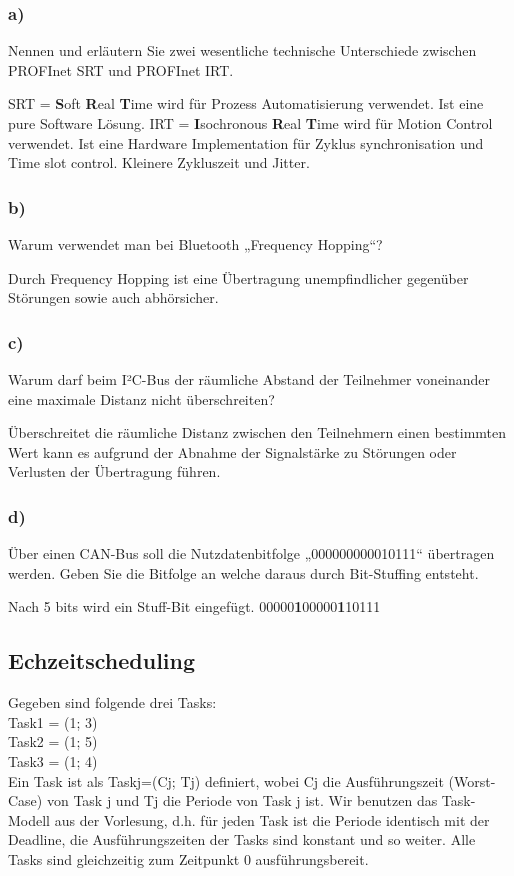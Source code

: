 \subsubsection{a)}
Nennen und erläutern Sie zwei wesentliche technische Unterschiede zwischen PROFInet SRT und
PROFInet IRT.

SRT = \textbf{S}oft \textbf{R}eal \textbf{T}ime wird für Prozess Automatisierung verwendet. Ist eine pure Software Lösung.
IRT = \textbf{I}sochronous \textbf{R}eal \textbf{T}ime wird für Motion Control verwendet. Ist eine Hardware Implementation  für Zyklus
synchronisation und Time slot control. Kleinere Zykluszeit und Jitter.

\subsubsection{b)}
Warum verwendet man bei Bluetooth „Frequency Hopping“?

Durch Frequency Hopping ist eine Übertragung unempfindlicher gegenüber Störungen sowie auch abhörsicher.

\subsubsection{c)}
Warum darf beim I²C-Bus der räumliche Abstand der Teilnehmer voneinander eine maximale
Distanz nicht überschreiten?

Überschreitet die räumliche Distanz zwischen den Teilnehmern einen bestimmten Wert kann es aufgrund der Abnahme
der Signalstärke zu Störungen oder Verlusten der Übertragung führen.

\subsubsection{d)}
Über einen CAN-Bus soll die Nutzdatenbitfolge „000000000010111“ übertragen werden. Geben Sie
die Bitfolge an welche daraus durch Bit-Stuffing entsteht.

Nach 5 bits wird ein Stuff-Bit eingefügt.
00000\textbf{1}00000\textbf{1}10111

\subsection{Echzeitscheduling}
Gegeben sind folgende drei Tasks:\\
Task1 = (1; 3)\\
Task2 = (1; 5)\\
Task3 = (1; 4)\\
Ein Task ist als Taskj=(Cj; Tj) definiert, wobei Cj die Ausführungszeit (Worst-Case) von Task j und Tj die
Periode von Task j ist. Wir benutzen das Task-Modell aus der Vorlesung, d.h. für jeden Task ist die Periode
identisch mit der Deadline, die Ausführungszeiten der Tasks sind konstant und so weiter. Alle Tasks sind
gleichzeitig zum Zeitpunkt 0 ausführungsbereit.

